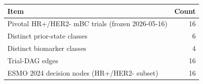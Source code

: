 \begin{tabular}{lr}\toprule
Item & Count \\ \midrule
Pivotal HR+/HER2- mBC trials (frozen 2026-05-16) & 16 \\
Distinct prior-state classes & 6 \\
Distinct biomarker classes & 4 \\
Trial-DAG edges & 16 \\
ESMO 2024 decision nodes (HR+/HER2- subset) & 16 \\
\bottomrule\end{tabular}
